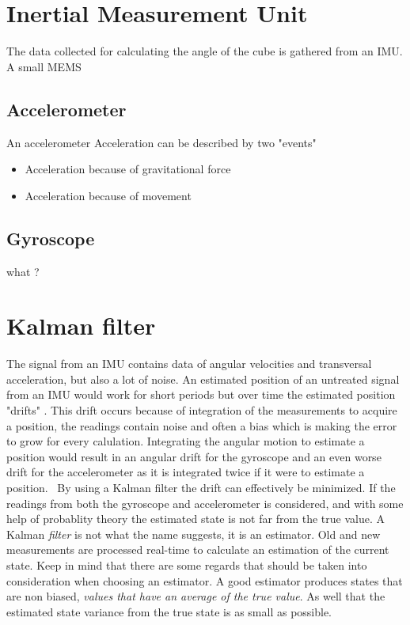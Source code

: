 \documentclass[a4paper,11pt]{kth-mag}
\begin{document}
\section{Inertial Measurement Unit}
The data collected for calculating the angle of the cube is gathered from an IMU. A small MEMS 
\subsection{Accelerometer}
An accelerometer Acceleration can be described by two "events"
\begin{itemize}
\item Acceleration because of gravitational force
\item Acceleration because of movement
\end{itemize}

\subsection{Gyroscope}
what ?



\section{Kalman filter}
The signal from an IMU contains data of angular velocities and transversal acceleration, but also a lot of noise. An estimated position of an untreated signal from an IMU would work for short periods but over time the estimated position "drifts" \cite{MEMSdrift}. This drift occurs because of integration of the measurements to acquire a position, the readings contain noise and often a bias which is making the  error to grow for every calulation. Integrating the angular motion to estimate a position would result in an angular drift for the gyroscope and an even worse drift for the accelerometer as it is integrated twice if it were to estimate a position.  \
By using a Kalman filter the drift can effectively be minimized. If the readings from both the gyroscope and accelerometer is considered, and with some help of probablity theory the estimated state is not far from the true value.  A Kalman \textit{filter} is not what the name suggests, it is an estimator. Old and new measurements are processed real-time to calculate an estimation of the current state.
Keep in mind that there are some regards that should be taken into consideration when choosing an estimator.
A good estimator produces states that are non biased, \emph{values that have an average  of the true value}. As well that the estimated state variance from the true state is as small as possible.\cite{Simon2001}
\end{document}
